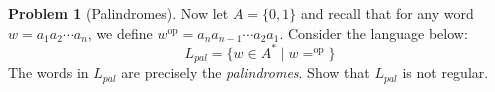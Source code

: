 \documentclass[11pt]{article}
\theoremstyle{theorem} %
\theoremstyle{definition} %
\newtheorem{problem}                    {{\color{BurntOrange}Problem}}
\theoremstyle{remark} %
\newcommand{\op}{\mathrm{op}}               %
\begin{document}
\pagebreak

\begin{problem}[Palindromes]
    Now let \(A = \{0,1\}\) and recall that for any word \(w = a_1 a_2 \cdots a_n\), we define \(w^{\op} = a_n a_{n-1} \cdots a_2 a_1\).
    Consider the language below:
    \[
        L_{pal} = \{w \in A^* \mid w = ^{\op}\}
    \]
    The words in \(L_{pal}\) are precisely the \emph{palindromes}.
    Show that \(L_{pal}\) is not regular.
\end{problem}
\end{document}
